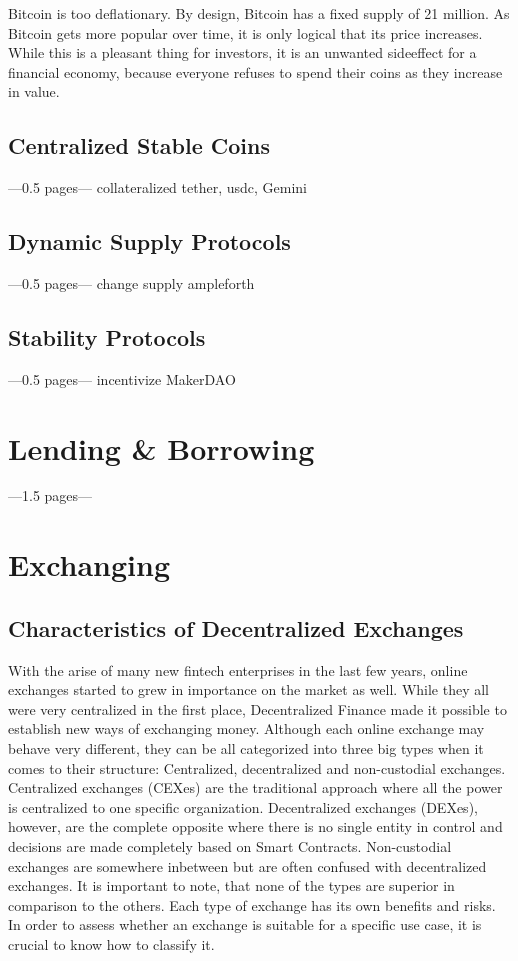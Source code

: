 Bitcoin is too deflationary. By design, Bitcoin has a fixed supply of 21 million. As Bitcoin gets more popular over time, it is only logical that its price increases. While this is a pleasant thing for investors, it is an unwanted sideeffect for a financial economy, because everyone refuses to spend their coins as they increase in value.
\subsection{Centralized Stable Coins}
---0.5 pages---
collateralized
tether, usdc, Gemini
\subsection{Dynamic Supply Protocols}
---0.5 pages---
change supply
ampleforth
\subsection{Stability Protocols}
---0.5 pages---
incentivize
MakerDAO

\section{Lending \& Borrowing}
---1.5 pages---

\section{Exchanging}
\subsection{Characteristics of Decentralized Exchanges}
With the arise of many new fintech enterprises in the last few years, online exchanges started to grew in importance on the market as well. While they all were very centralized in the first place, Decentralized Finance made it possible to establish new ways of exchanging money. Although each online exchange may behave very different, they can be all categorized into three big types when it comes to their structure: Centralized, decentralized and non-custodial exchanges. Centralized exchanges (CEXes) are the traditional approach where all the power is centralized to one specific organization. Decentralized exchanges (DEXes), however, are the complete opposite where there is no single entity in control and decisions are made completely based on Smart Contracts. Non-custodial exchanges are somewhere inbetween but are often confused with decentralized exchanges. It is important to note, that none of the types are superior in comparison to the others. Each type of exchange has its own benefits and risks. In order to assess whether an exchange is suitable for a specific use case, it is crucial to know how to classify it.

